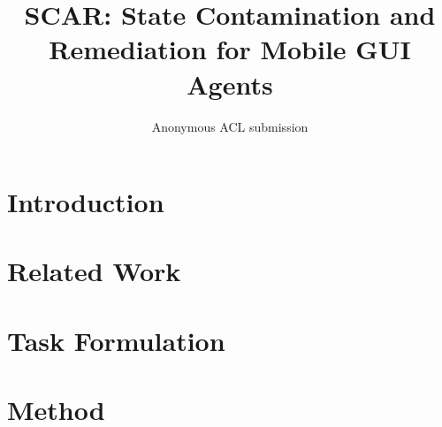 \documentclass[11pt]{article}
\title{SCAR: State Contamination and Remediation for Mobile GUI Agents}
\author{Anonymous ACL submission}
\begin{document}
\maketitle

\begin{abstract}
\end{abstract}

\section{Introduction}

\section{Related Work}

\section{Task Formulation}

\section{Method}
\end{document}
